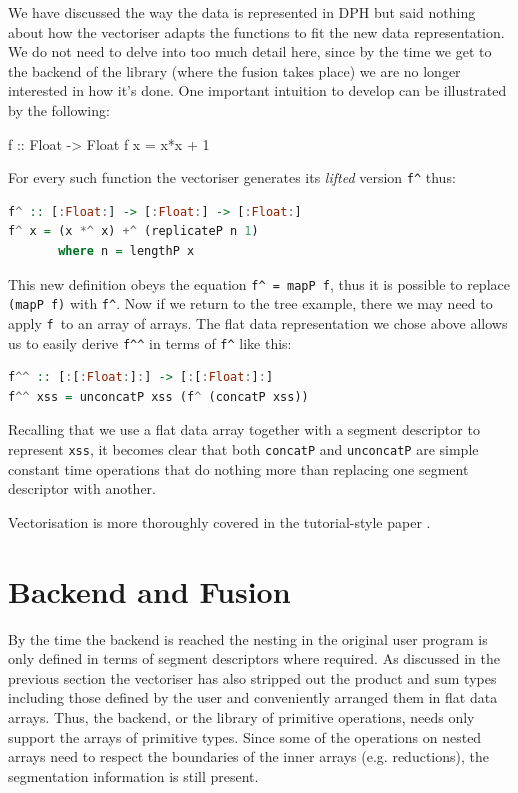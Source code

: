 \documentclass[preamble.tex]{subfiles}
\begin{document}
We have discussed the way the data is represented in DPH but said nothing about how the vectoriser adapts the functions to fit the new data representation. We do not need to delve into too much detail here, since by the time we get to the backend of the library (where the fusion takes place) we are no longer interested in how it's done. One important intuition to develop can be illustrated by the following:

\begin{hscode}
f :: Float -> Float
f x = x*x + 1
\end{hscode}


For every such function the vectoriser generates its \emph{lifted }version \texttt{f\textasciicircum{}} thus:

\begin{lstlisting}[basicstyle={\ttfamily},language=Haskell]
f^ :: [:Float:] -> [:Float:] -> [:Float:]
f^ x = (x *^ x) +^ (replicateP n 1)
       where n = lengthP x
\end{lstlisting}


This new definition obeys the equation \texttt{f\textasciicircum{} = mapP f}, thus it is possible to replace \texttt{(mapP f)} with \texttt{f\textasciicircum{}}. Now if we return to the tree example, there we may need to apply \texttt{f }to an array of arrays. The flat data representation we chose above allows us to easily derive \texttt{f\textasciicircum{}\textasciicircum{}} in terms of \texttt{f\textasciicircum{}} like this:

\begin{lstlisting}[basicstyle={\ttfamily},language=Haskell]
f^^ :: [:[:Float:]:] -> [:[:Float:]:]
f^^ xss = unconcatP xss (f^ (concatP xss))
\end{lstlisting}


Recalling that we use a flat data array together with a segment descriptor to represent \texttt{xss}, it becomes clear that both \texttt{concatP} and \texttt{unconcatP} are simple constant time operations that do nothing more than replacing one segment descriptor with another.

Vectorisation is more thoroughly covered in the tutorial-style paper \cite{PLKC08}.


\section{Backend and Fusion}

By the time the backend is reached the nesting in the original user program is only defined in terms of segment descriptors where required. As discussed in the previous section the vectoriser has also stripped out the product and sum types including those defined by the user and conveniently arranged them in flat data arrays. Thus, the backend, or the library of primitive operations, needs only support the arrays of primitive types. Since some of the operations on nested arrays need to respect the boundaries of the inner arrays (e.g. reductions), the segmentation information is still present.
\end{document}
